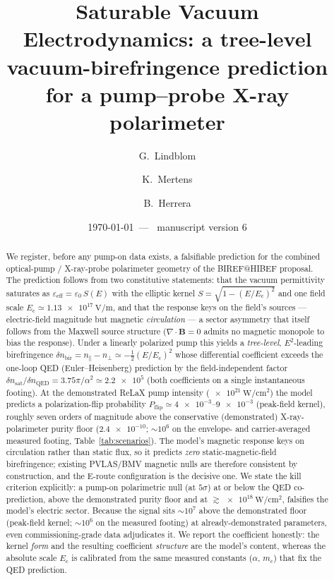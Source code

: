 \documentclass[aps,prd,twocolumn,superscriptaddress,nofootinbib,longbibliography]{revtex4-2}
\newcommand{\Ec}{E_{\mathrm{c}}}
\newcommand{\dnbir}{\delta n_{\mathrm{bir}}}
\newcommand{\dnsat}{\delta n_{\mathrm{sat}}}
\newcommand{\Pflip}{P_{\mathrm{flip}}}
\begin{document}
\title{Saturable Vacuum Electrodynamics: a tree-level vacuum-birefringence
prediction for a pump--probe X-ray polarimeter}

\author{G.~Lindblom}
\author{K.~Mertens}
\author{B.~Herrera}

\date{\today\textrm{~---~ manuscript version 6}}

\begin{abstract}
We register, before any pump-on data exists, a falsifiable prediction for the
combined optical-pump / X-ray-probe polarimeter geometry of the BIREF@HIBEF
proposal. The prediction follows from two constitutive statements: that the
vacuum permittivity saturates as $\varepsilon_{\mathrm{eff}}=\varepsilon_0\,
S(E)$ with the elliptic kernel $S=\sqrt{1-(E/\Ec)^2}$ and one field scale
$\Ec\simeq\SI{1.13e17}{\volt\per\meter}$, and that the response keys on the
field's sources --- electric-field magnitude but magnetic \emph{circulation} ---
a sector asymmetry that itself follows from the Maxwell source structure
($\nabla\cdot\mathbf B=0$ admits no magnetic monopole to bias the response). Under
a linearly polarized pump this
yields a \emph{tree-level}, $E^2$-leading birefringence $\dnbir=n_\parallel-
n_\perp\simeq-\tfrac12(E/\Ec)^2$ whose differential coefficient exceeds the
one-loop QED (Euler--Heisenberg) prediction by the field-independent factor
$\dnsat/\delta n_{\mathrm{QED}}=3.75\pi/\alpha^2\simeq
\num{2.2e5}$ (both coefficients on a single instantaneous footing). At the demonstrated ReLaX pump intensity
($\SI{e21}{\watt\per\centi\meter\squared}$) the model predicts a
polarization-flip probability $\Pflip\simeq\numrange{4e-3}{9e-3}$ (peak-field
kernel), roughly seven orders of magnitude above the conservative (demonstrated)
X-ray-polarimeter purity floor ($\num{2.4e-10}$; $\sim\!10^6$ on the envelope- and
carrier-averaged measured footing, Table~\ref{tab:scenarios}). The model's magnetic response keys on circulation rather
than static flux, so it predicts \emph{zero} static-magnetic-field
birefringence; existing PVLAS/BMV magnetic nulls are therefore consistent by
construction, and the E-route configuration is the decisive one. We state the
kill criterion explicitly: a pump-on polarimetric null (at $5\sigma$) at or
below the QED co-prediction, above the demonstrated purity floor and at
$\gtrsim\SI{e18}{\watt\per\centi\meter\squared}$, falsifies the model's
electric sector. Because the signal sits $\sim\!10^7$ above the demonstrated
floor (peak-field kernel; $\sim\!10^6$ on the measured footing) at
already-demonstrated parameters, even commissioning-grade data adjudicates it. We report the coefficient honestly: the kernel \emph{form} and
the resulting coefficient \emph{structure} are the model's content, whereas the
absolute scale $\Ec$ is calibrated from the same measured constants
($\alpha$, $m_e$) that fix the QED prediction.
\end{abstract}
\end{document}
